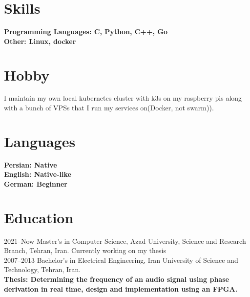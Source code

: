 \documentclass[8pt]{article}
\begin{document}
\begin{multicols}{2}
  \section*{Skills}
  \bf Programming Languages: \normalfont C, Python, C++, Go\\[5pt]
  \bf Other: \normalfont Linux, docker\\[5pt]

  \section*{Hobby}
  I maintain my own local kubernetes cluster with k3s on my raspberry pis along with a bunch of VPSs that I run my services on(Docker, not swarm)).\\[5pt]

  \section*{Languages}
  \bf Persian: {\normalfont Native}\\
  \bf English: {\normalfont Native-like}\\
  \normalfont German: Beginner\\

  \section*{Education}
  2021--Now Master's in Computer Science, Azad University, Science and Research Branch, Tehran, Iran. Currently working on my thesis\\[5pt]
  2007--2013 Bachelor's in Electrical Engineering, Iran University of Science and Technology, Tehran, Iran.\\[5pt]
  \bf Thesis: \normalfont Determining the frequency of an audio signal using phase derivation in real time, design and implementation using an FPGA.


\end{multicols}
\end{document}
